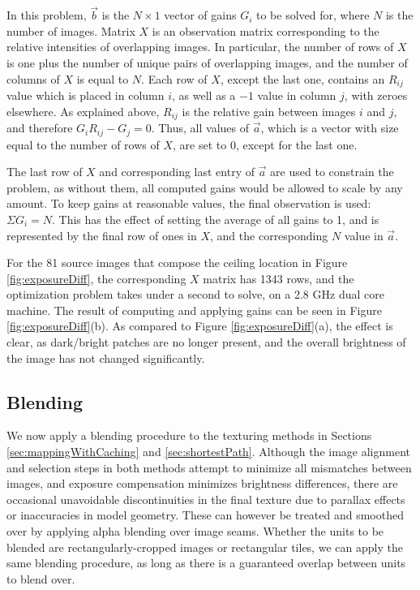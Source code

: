 \documentclass[]{spie}  %
\begin{document}
In this problem, $\vec{b}$ is the $N\times1$ vector of gains $G_i$ to
be solved for, where $N$ is the number of images.  Matrix $X$ is an
observation matrix corresponding to the relative intensities of
overlapping images. In particular, the number of rows of $X$ is one
plus the number of unique pairs of overlapping images, and the number
of columns of $X$ is equal to $N$. Each row of $X$, except the last
one, contains an $R_{ij}$ value which is placed in column $i$, as well
as a $-1$ value in column $j$, with zeroes elsewhere. As explained
above, $R_{ij}$ is the relative gain between images $i$ and $j$, and
therefore $G_iR_{ij} - G_j = 0$.  Thus, all values of $\vec{a}$, which
is a vector with size equal to the number of rows of $X$, are set to
$0$, except for the last one.

The last row of $X$ and corresponding last entry of $\vec{a}$ are used
to constrain the problem, as without them, all computed gains would be
allowed to scale by any amount. To keep gains at reasonable values,
the final observation is used: $\Sigma G_i = N$. This has the effect
of setting the average of all gains to 1, and is represented by the
final row of ones in $X$, and the corresponding $N$ value in
$\vec{a}$.

For the 81 source images that compose the ceiling location in Figure
\ref{fig:exposureDiff}, the corresponding $X$ matrix has 1343 rows,
and the optimization problem takes under a second to solve, on a 2.8
GHz dual core machine.  The result of computing and applying gains can
be seen in Figure \ref{fig:exposureDiff}(b). As compared to Figure
\ref{fig:exposureDiff}(a), the effect is clear, as dark/bright patches
are no longer present, and the overall brightness of the image has not
changed significantly.

\subsection{Blending}
\label{sec:blending}
We now apply a blending procedure to the texturing methods in Sections
\ref{sec:mappingWithCaching} and \ref{sec:shortestPath}. Although the
image alignment and selection steps in both methods attempt to
minimize all mismatches between images, and exposure compensation
minimizes brightness differences, there are occasional unavoidable
discontinuities in the final texture due to parallax effects or
inaccuracies in model geometry. These can however be treated and
smoothed over by applying alpha blending over image seams.  Whether
the units to be blended are rectangularly-cropped images or
rectangular tiles, we can apply the same blending procedure, as long
as there is a guaranteed overlap between units to blend over.
\end{document}
